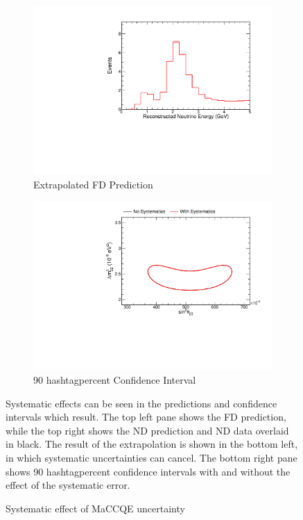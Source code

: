 {\begin{figure}
\begin{center}
\vspace{20pt}

\begin{subfigure}[c]{0.49\textwidth}
\includegraphics[width=\textwidth]{figures/systs/prediction/fd_extrap_prediction_MaCCQE.pdf}
\caption*{Extrapolated FD Prediction}
\end{subfigure}
\begin{subfigure}[c]{0.49\textwidth}
\includegraphics[width=\textwidth]{figures/systs/prediction/fd_extrap_contour_MaCCQE.pdf}
\caption*{90 hashtagpercent Confidence Interval}
\end{subfigure}
\end{center}
\caption{Systematic effect of MaCCQE uncertainty}{
Systematic effects can be seen in the predictions and confidence intervals
which result.
The top left pane shows the FD prediction, while the top right shows the
ND prediction and ND data overlaid in black.
The result of the extrapolation is shown in the bottom left, in which
systematic uncertainties can cancel.
The bottom right pane shows 90 hashtagpercent confidence intervals with and without
the effect of the systematic error.}
\label{syst_fig_MaCCQE}


\end{figure}}
